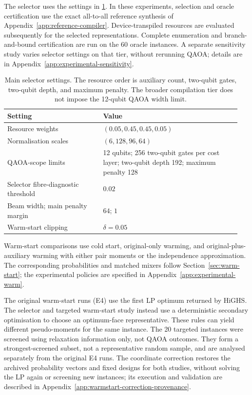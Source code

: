 \documentclass[a4paper,onecolumn,11pt,unpublished]{quantumarticle}
\theoremstyle{remark}
\begin{document}
The selector uses the settings in \cref{tab:selector-settings}. In these
experiments, selection and oracle certification use the exact all-to-all
reference synthesis of Appendix~\ref{app:reference-compiler}.
Device-transpiled resources are evaluated subsequently for the selected
representations. Complete
enumeration and branch-and-bound certification are run on the 60 oracle
instances. A separate sensitivity study varies selector settings on that tier,
without rerunning QAOA; details are in Appendix~\ref{app:experimental-sensitivity}.

\begin{table}[t]
\centering
\small
\caption{Main selector settings. The resource order is auxiliary count,
two-qubit gates, two-qubit depth, and maximum penalty. The broader compilation
tier does not impose the 12-qubit QAOA width limit.}
\label{tab:selector-settings}
\begin{tabular}{@{}p{0.39\linewidth}p{0.56\linewidth}@{}}
\toprule
Setting & Value\\
\midrule
Resource weights & $(0.05,0.45,0.45,0.05)$\\
Normalisation scales & $(6,128,96,64)$\\
QAOA-scope limits & 12 qubits; 256 two-qubit gates per cost layer;
 two-qubit depth 192; maximum penalty 128\\
Selector fibre-diagnostic threshold & $0.02$\\
Beam width; main penalty margin & $64$; $1$\\
Warm-start clipping & $\delta=0.05$\\
\bottomrule
\end{tabular}
\end{table}

Warm-start comparisons use cold start, original-only warming, and
original-plus-auxiliary warming with either pair moments or the independence
approximation. The corresponding probabilities and matched mixers follow
Section~\ref{sec:warm-start}; the experimental policies are specified in
Appendix~\ref{app:experimental-warm}.

The original warm-start runs (E4) use the first LP optimum returned by HiGHS.
The selector and targeted warm-start study instead use a deterministic
secondary optimisation to choose an optimum-face representative. These rules
can yield different pseudo-moments for the same instance. The 20 targeted
instances were screened using relaxation information only, not QAOA outcomes.
They form a strongest-screened subset, not a representative random sample,
and are analysed separately from the original E4 runs. The coordinate
correction restores the archived probability vectors and fixed designs for
both studies, without solving the LP again or screening new instances;
its execution and validation are described in
Appendix~\ref{app:warmstart-correction-provenance}.
\end{document}
